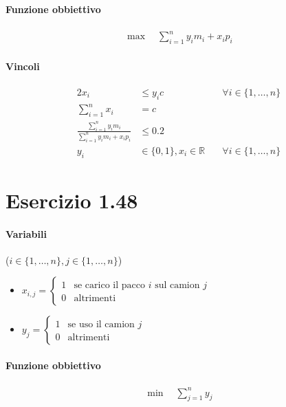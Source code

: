 \documentclass{article}
\begin{document}
\paragraph{Funzione obbiettivo}
\begin{align*}
  \max \quad \sum_{i=1}^n y_i m_i + x_i p_i
\end{align*}

\paragraph{Vincoli}
\begin{alignat}{2}
  x_i &\leq y_i c &\forall i \in \{1,\ldots,n\} \\
  \sum_{i=1}^n x_i &= c &\\
  \frac{\sum_{i=1}^n y_i m_i}{\sum_{i=1}^n y_i m_i + x_i p_i} &\leq 0.2 &\\
  y_i &\in \{0,1\}, x_i \in \mathbb{R} \quad &\forall i \in \{1,\ldots,n\}
\end{alignat}

\pagebreak
\section{Esercizio 1.48}

\paragraph{Variabili} ($i \in \{1,\ldots,n\}, j \in \{1,\ldots,n\}$)
\begin{itemize}
  \item $x_{i,j} = \begin{cases}
    1 &\text{se carico il pacco }i\text{ sul camion }j\\
    0 &\text{altrimenti}
  \end{cases}$
  \item $y_j = \begin{cases}
    1 &\text{se uso il camion }j\\
    0 &\text{altrimenti}
  \end{cases}$
\end{itemize}

\paragraph{Funzione obbiettivo}
\begin{align*}
  \min \quad \sum_{j=1}^n y_j
\end{align*}
\end{document}
